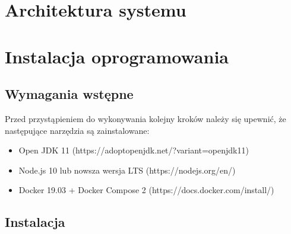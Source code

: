 \section{Architektura systemu}\label{sec:system-architecture}
\section{Instalacja oprogramowania}\label{sec:software-installation}
\subsection{Wymagania wstępne}\label{subsec:prerequirements}
Przed przystąpieniem do wykonywania kolejny kroków należy się upewnić, że następujące narzędzia są zainstalowane:
\begin{itemize}
    \item Open JDK 11 (https://adoptopenjdk.net/?variant=openjdk11)
    \item Node.js 10 lub nowsza wersja LTS (https://nodejs.org/en/)
    \item Docker 19.03 + Docker Compose 2 (https://docs.docker.com/install/)
\end{itemize}

\subsection{Instalacja}\label{subsec:installation}

